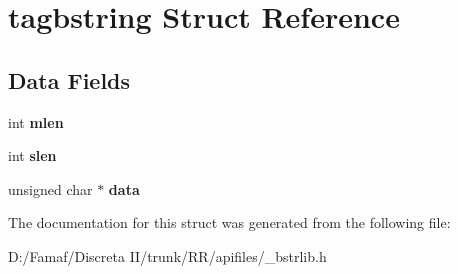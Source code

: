 \hypertarget{structtagbstring}{\section{tagbstring Struct Reference}
\label{structtagbstring}
}
\subsection*{Data Fields}
\begin{DoxyCompactItemize}
\item 
\hypertarget{structtagbstring_a9c4822dec37f1e532c6a73ddf66866d2}{int {\bfseries mlen}}\label{structtagbstring_a9c4822dec37f1e532c6a73ddf66866d2}

\item 
\hypertarget{structtagbstring_a77e5778dba48d5d75c364f1c6f9f5da4}{int {\bfseries slen}}\label{structtagbstring_a77e5778dba48d5d75c364f1c6f9f5da4}

\item 
\hypertarget{structtagbstring_ac24cea2bfcc927fd29bc74d1086707d8}{unsigned char $\ast$ {\bfseries data}}\label{structtagbstring_ac24cea2bfcc927fd29bc74d1086707d8}

\end{DoxyCompactItemize}


The documentation for this struct was generated from the following file\+:\begin{DoxyCompactItemize}
\item 
D\+:/\+Famaf/\+Discreta I\+I/trunk/\+R\+R/apifiles/\+\_\+bstrlib.\+h\end{DoxyCompactItemize}
